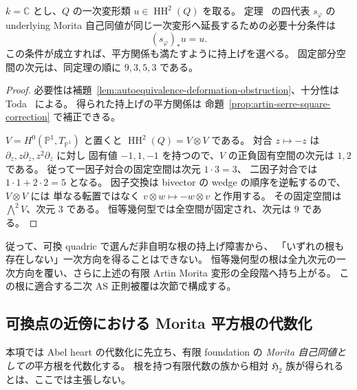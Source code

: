 \begin{proposition}[四つの根の一次持上げ条件]
\label{prop:quadric-four-root-tangents}
$k=\mathbb C$ とし、$Q$ の一次変形類
$u\in\operatorname{HH}^2(Q)$ を取る。
定理~\cite[\texttt{thm:commutative-four-roots}]{QuadricIntrinsic2026} の四代表 $s_\varphi$ の underlying
Morita 自己同値が同じ一次変形へ延長するための必要十分条件は
\[
 (s_\varphi)_*u=u.
\]
この条件が成立すれば、平方関係も満たすように持上げを選べる。
固定部分空間の次元は、同定理の順に $9,3,5,3$ である。
\end{proposition}
\begin{proof}
必要性は補題~\ref{lem:autoequivalence-deformation-obstruction}、十分性は
Toda~\cite[Theorem 4.7, arXiv v3]{Toda2009} による。
得られた持上げの平方関係は
命題~\ref{prop:artin-serre-square-correction} で補正できる。

$V=H^0(\mathbb P^1,T_{\mathbb P^1})$ と置くと
$\operatorname{HH}^2(Q)=V\otimes V$ である。
対合 $z\mapsto-z$ は $\partial_z,z\partial_z,z^2\partial_z$ に対し
固有値 $-1,1,-1$ を持つので、$V$ の正負固有空間の次元は $1,2$ である。
従って一因子対合の固定空間は次元 $1\cdot3=3$、
二因子対合では $1\cdot1+2\cdot2=5$ となる。
因子交換は bivector の wedge の順序を逆転するので、$V\otimes V$ には
単なる転置ではなく $v\otimes w\mapsto-w\otimes v$ と作用する。
その固定空間は $\bigwedge^2V$、次元 $3$ である。
恒等幾何型では全空間が固定され、次元は $9$ である。
\end{proof}

従って、可換 quadric で選んだ非自明な根の持上げ障害から、
「いずれの根も存在しない」一次方向を得ることはできない。
恒等幾何型の根は全九次元の一次方向を覆い、さらに上述の有限 Artin
Morita 変形の全段階へ持ち上がる。
この根に適合する二次 AS 正則被覆は次節で構成する。


\subsection{可換点の近傍における Morita 平方根の代数化}
\label{subsec:quadric-etale-morita-root}

本項では Abel heart の代数化に先立ち、有限 foundation の
\emph{Morita 自己同値としての}平方根を代数化する。
根を持つ有限代数の族から相対 $\mathfrak H_2$ 族が得られるとは、ここでは主張しない。

